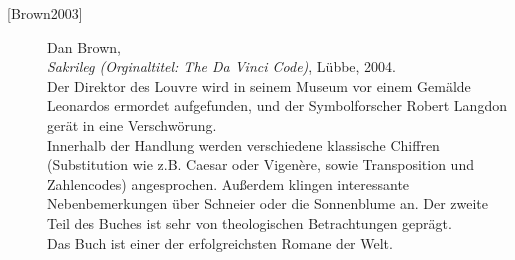 \begin{description}
\item[\textrm{[Brown2003]}] 
    Dan Brown, \\
    {\em Sakrileg (Orginaltitel: The Da Vinci Code)}, Lübbe, 2004. \\
    Der Direktor des Louvre wird in seinem Museum vor einem Gemälde Leonardos
    ermordet aufgefunden, und der Symbolforscher Robert Langdon gerät in eine
    Verschwörung.\\
    Innerhalb der Handlung werden verschiedene klassische Chiffren (Substitution
    wie z.B. Caesar oder Vigen\`ere, sowie Transposition und Zahlencodes)
    angesprochen. Außerdem klingen interessante Nebenbemerkungen über
    Schneier oder die Sonnenblume an.
    Der zweite Teil des Buches ist sehr von theologischen Betrachtungen
    geprägt. \\
    Das Buch ist einer der erfolgreichsten Romane der Welt.\\





\end{description}
